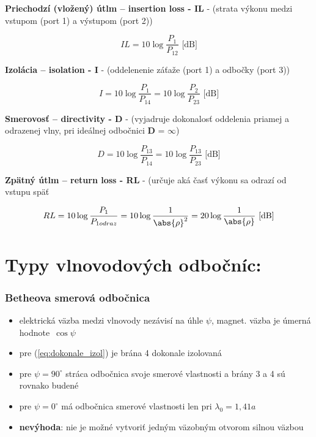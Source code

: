 	{\raggedright
	\textbf{Priechodzí (vložený) útlm -- insertion loss - IL} - (strata výkonu medzi vstupom (port 1) a výstupom (port 2))}
	\begin{equation}
		IL = 10 \log \frac{P_1}{P_{12}} \text{    [dB]}
	\end{equation}
	
	{\raggedright
	\textbf{Izolácia -- isolation - I} - (oddelenenie záťaže (port 1) a odbočky (port 3))}
	\begin{equation}
		I = 10 \log \frac{P_1}{P_{14}} = 10 \log \frac{P_2}{P_{23}} \text{    [dB]}
	\end{equation}
	
	{\raggedright
	\textbf{Smerovosť -- directivity - D} - (vyjadruje dokonalosť oddelenia priamej a odrazenej vlny, pri ideálnej odbočnici \textbf{D} = $\infty$)}
	\begin{equation}
		D = 10 \log \frac{P_{13}}{P_{14}} = 10 \log \frac{P_{13}}{P_{23}} \text{    [dB]}
	\end{equation}
	
	{\raggedright
	\textbf{Zpätný útlm -- return loss - RL} - (určuje aká časť výkonu sa odrazí od vstupu späť}
	\begin{equation}
	RL = 10 \log \frac{P_1}{P_{1odraz}} = 10\log{\frac{1}{\abs{\rho}^2}} = 20 \log {\frac{1}{\abs{\rho}}} \text{    [dB]}
	\end{equation}
	
	\section{Typy vlnovodových odbočníc:}
	\subsubsection{Betheova smerová odbočnica}
	\begin{itemize}[label=--]
		\item elektrická väzba medzi vlnovody nezávisí na úhle $\psi$, magnet. väzba je úmerná hodnote~$\cos\psi$
		\item pre (\ref{eq:dokonale_izol}) je brána 4 dokonale izolovaná
		\item pre $\psi = 90^\circ$ stráca odbočnica svoje smerové vlastnosti a brány 3 a 4 sú rovnako budené
		\item pre $\psi = 0^\circ$ má odbočnica smerové vlastnosti len pri $\lambda_0 = 1,41a$
		\item \textbf{nevýhoda}: nie je možné vytvoriť jedným väzobným otvorom silnou väzbou 
	\end{itemize}
	
